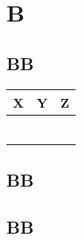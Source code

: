 
\section[A]{B}
    
    \subsection[AA]{BB}


        \vspace{0.5cm}
        \renewcommand{\arraystretch}{1.5}
        \begin{tabular}{p{3cm}p{5.86cm}p{5.86cm}}
            \toprule
            \textbf{X} & \textbf{Y} & \textbf{Z} \\
            \midrule
            &&\\
            &&\\
            &&\\
            &&\\
            &&\\
            &&\\
            \bottomrule
        \end{tabular}
        \vspace{0.5cm}

    \subsection[AA]{BB}

    \subsection[AA]{BB}


